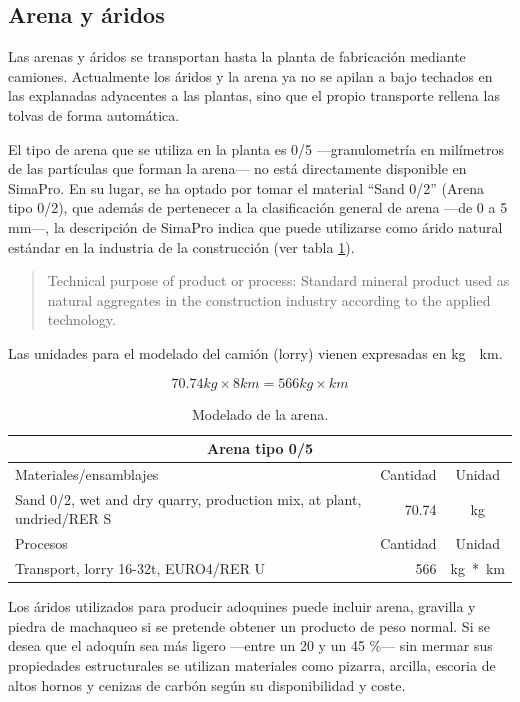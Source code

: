 \subsection{Arena y áridos}
Las arenas y áridos se transportan hasta la planta de fabricación mediante camiones. Actualmente los áridos y la arena ya no se apilan a bajo techados en las explanadas adyacentes a las plantas, sino que el propio transporte rellena las tolvas de forma automática.

El tipo de arena que se utiliza en la planta es 0/5 —granulometría en milímetros de las partículas que forman la arena— no está directamente disponible en SimaPro. En su lugar, se ha optado por tomar el material ``Sand 0/2'' (Arena tipo 0/2), que además de pertenecer a la clasificación general de arena —de 0 a 5 \si{mm}—, la descripción de SimaPro indica que puede utilizarse como árido natural estándar en la industria de la construcción (ver tabla \ref{modeladodelaarena}).

\begin{quote}
Technical purpose of product or process: Standard mineral product used as natural aggregates in the construction industry according to the applied technology.
\end{quote}

Las unidades para el modelado del camión (lorry) vienen expresadas en \si{kg\times km}.

\begin{equation}
70.74 kg \times 8 km = 566 kg\times km
\end{equation}

\begin{table}[!htb]
\centering
\begin{tabular}{p{8cm}rc}
\toprule
\multicolumn{3}{c}{Arena tipo 0/5}\\
\midrule
Materiales/ensamblajes & Cantidad & Unidad\\
\midrule
Sand 0/2, wet and dry quarry, production mix, at plant, undried/RER S & 70.74 & \si{kg}\\
\midrule
Procesos & Cantidad & Unidad\\
\midrule
Transport, lorry 16-32t, EURO4/RER U & 566 & \si{kg*km}\\
\bottomrule
\end{tabular}
\caption{Modelado de la arena.}
\label{modeladodelaarena}
\end{table}

Los áridos utilizados para producir adoquines puede incluir arena, gravilla y piedra de machaqueo si se pretende obtener un producto de peso normal. Si se desea que el adoquín sea más ligero —entre un 20 y un 45 \%— sin mermar sus propiedades estructurales se utilizan materiales como pizarra, arcilla, escoria de altos hornos y cenizas de carbón según su disponibilidad y coste.


